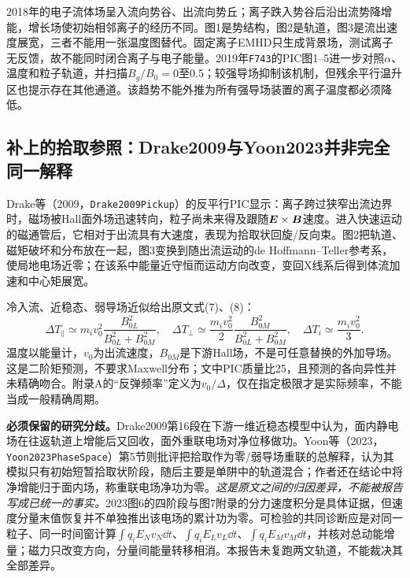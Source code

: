 2018年的电子流体场呈入流向势谷、出流向势丘；离子跌入势谷后沿出流势降增能，增长场使初始相邻离子的经历不同。图1是势结构，图2是轨道，图3是流出速度展宽，三者不能用一张温度图替代。固定离子EMHD只生成背景场，测试离子无反馈，故不能同时闭合离子与电子能量。2019年\texttt{F743}的PIC图1--5进一步对照$\alpha$、温度和粒子轨道，并扫描$B_g/B_0=0$至0.5；较强导场抑制该机制，但残余平行温升区也提示存在其他通道。该趋势不能外推为所有强导场装置的离子温度都必须降低。\citep{F743}

\subsection{补上的拾取参照：Drake2009与Yoon2023并非完全同一解释}
Drake等（2009，\texttt{Drake2009Pickup}）的反平行PIC显示：离子跨过狭窄出流边界时，磁场被Hall面外场迅速转向，粒子尚未来得及跟随$\bm{E}\times\bm{B}$速度。进入快速运动的磁通管后，它相对于出流具有大速度，表现为拾取状回旋/反向束。图2把轨道、磁矩破坏和分布放在一起，图3变换到随出流运动的de Hoffmann--Teller参考系，使局地电场近零；在该系中能量近守恒而运动方向改变，变回X线系后得到体流加速和中心矩展宽。\citep{Drake2009Pickup}

冷入流、近稳态、弱导场近似给出原文式(7)、(8)：
\begin{equation}
\Delta T_\parallel\simeq m_i v_0^2\frac{B_{0L}^2}{B_{0L}^2+B_{0M}^2},\quad
\Delta T_\perp\simeq\frac{m_i v_0^2}{2}\frac{B_{0M}^2}{B_{0L}^2+B_{0M}^2},\quad
\Delta T_i\simeq\frac{m_i v_0^2}{3}.
\end{equation}
温度以能量计，$v_0$为出流速度，$B_{0M}$是下游Hall场，不是可任意替换的外加导场。这是二阶矩预测，不要求Maxwell分布；文中PIC质量比25，且预测的各向异性并未精确吻合。附录A的“反弹频率”定义为$v_0/\Delta$，仅在指定极限才是实际频率，不能当成一般精确周期。

\textbf{必须保留的研究分歧。}Drake2009第16段在下游一维近稳态模型中认为，面内静电场在往返轨道上增能后又回收，面外重联电场对净位移做功。Yoon等（2023，\texttt{Yoon2023PhaseSpace}）第5节则批评把拾取作为零/弱导场重联的总解释，认为其模拟只有初始短暂拾取状阶段，随后主要是单阱中的轨道混合；作者还在结论中将净增能归于面内场，称重联电场净功为零。\emph{这是原文之间的归因差异，不能被报告写成已统一的事实。}2023图6的四阶段与图7附录的分力速度积分是具体证据，但速度分量末值恢复并不单独推出该电场的累计功为零。可检验的共同诊断应是对同一粒子、同一时间窗计算$\int q_i E_Nv_N\dd t$、$\int q_i E_Lv_L\dd t$、$\int q_i E_Mv_M\dd t$，并核对总动能增量；磁力只改变方向，分量间能量转移相消。本报告未复跑两文轨道，不能裁决其全部差异。\citep{Yoon2023PhaseSpace}

